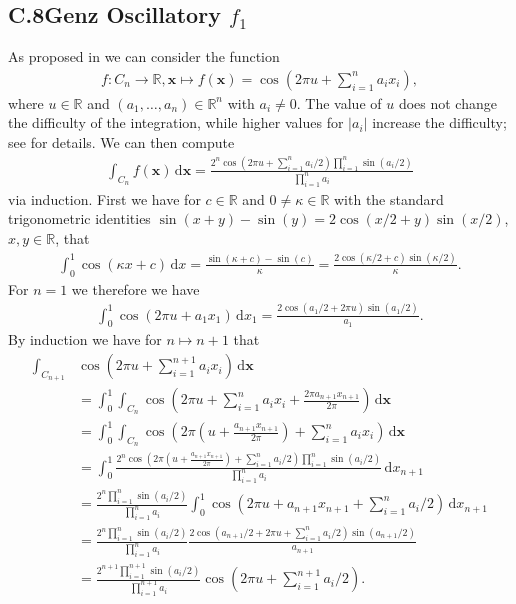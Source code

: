 \documentclass[11pt]{article}
\def\R{\mathbb{R}}
\def\d{\,\mathrm{d}}
\newcommand{\abs}[1]{\left|#1\right|}
\def\bx{\mathbf{x}}
\begin{document}
\subsection*{C.8\hspace{0.5cm}Genz Oscillatory $f_1$}
As proposed in \cite[Table 1, p. 84]{Genz1984} we can consider the function
\begin{align*}
f\colon C_{n}\to\R, \bx \mapsto f(\bx) = \cos\left(2\pi u + \sum^{n}_{i=1} a_i x_i \right),
\end{align*}
where $u\in\mathbb{R}$ and $(a_1,\dots,a_n) \in \mathbb{R}^n$ with $a_i\neq 0$.
The value of $u$ does not change the difficulty of the integration, while higher values for $\abs{a_i}$ increase the difficulty; see \cite[p. 84]{Genz1984} for details. 
We can then compute
\begin{align*}
\int_{C_{n}} f(\bx) \d\bx = \frac{2^n \cos\left(2\pi u + \sum_{i=1}^{n}a_i/2\right) \prod_{i=1}^n \sin(a_i/2)}{\prod_{i=1}^n a_i}
\end{align*}
via induction. 
First we have for $c\in\mathbb{R}$ and $0\neq\kappa\in\mathbb{R}$ with the standard trigonometric identities $\sin(x+y)-\sin(y) = 2\cos(x/2+y)\sin(x/2)$, $x,y\in\mathbb{R}$, that 
\begin{align*}
\int_0^1 \cos(\kappa x  + c) \d x = \frac{\sin(\kappa + c) - \sin(c)}{\kappa} = \frac{2\cos(\kappa/2+c)\sin(\kappa/2)}{\kappa}.
\end{align*}
For $n=1$ we therefore we have
\begin{align*}
\int_0^1 \cos\left(2\pi u + a_1 x_1 \right) \d x_1 = \frac{2\cos(a_1/2+2\pi u)\sin(a_1/2)}{a_1}.
\end{align*}
By induction we have for $n \mapsto n+1$ that
\begin{align*}
\int_{C_{n+1}} &\cos\left(2\pi u + \sum^{n+1}_{i=1} a_i x_i \right) \d\bx \\
&= \int_0^1 \int_{C_{n}} \cos\left(2\pi u + \sum^{n}_{i=1} a_i x_i + \frac{2\pi a_{n+1}x_{n+1}}{2\pi}\right) \d\bx\\
&= \int_0^1 \int_{C_{n}} \cos\left(2\pi \left( u + \frac{a_{n+1}x_{n+1}}{2\pi} \right) + \sum^{n}_{i=1} a_i x_i \right) \d\bx\\
&= \int_0^1 \frac{2^n \cos\left(2\pi \left( u + \frac{a_{n+1}x_{n+1}}{2\pi} \right) + \sum_{i=1}^{n}a_i/2\right) \prod_{i=1}^n \sin(a_i/2)}{\prod_{i=1}^n a_i} \d x_{n+1}\\
&= \frac{2^n \prod_{i=1}^n \sin(a_i/2)}{\prod_{i=1}^n a_i} \int_0^1 \cos\left(2\pi u + a_{n+1}x_{n+1}  + \sum_{i=1}^{n}a_i/2\right) \d x_{n+1}\\
&= \frac{2^n \prod_{i=1}^n \sin(a_i/2)}{\prod_{i=1}^n a_i} \frac{2\cos\left(a_{n+1}/2+2\pi u + \sum_{i=1}^{n}a_i/2\right)\sin(a_{n+1}/2)}{a_{n+1}}\\
&= \frac{2^{n+1} \prod_{i=1}^{n+1} \sin(a_i/2)}{\prod_{i=1}^{n+1} a_i} \cos\left(2\pi u + \sum_{i=1}^{n+1}a_i/2\right).
\end{align*}
\end{document}
